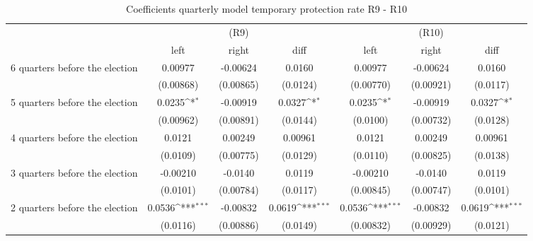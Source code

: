 \begin{table}[!ht]\centering \footnotesize
\def\sym#1{\ifmmode^{#1}\else\(^{#1}\)\fi}
\caption{Coefficients quarterly model temporary protection rate R9 - R10}
\begin{tabular}{l*{6}{c}}
\hline\hline
                    &\multicolumn{3}{c}{(R9)}&\multicolumn{3}{c}{(R10)}\\
&\multicolumn{1}{c}{left}&\multicolumn{1}{c}{right}&\multicolumn{1}{c}{diff}&\multicolumn{1}{c}{left}&\multicolumn{1}{c}{right}&\multicolumn{1}{c}{diff}\\
\hline
 6 quarters before the election&     0.00977         &    -0.00624         &      0.0160         &     0.00977         &    -0.00624         &      0.0160         \\
                    &   (0.00868)         &   (0.00865)         &    (0.0124)         &   (0.00770)         &   (0.00921)         &    (0.0117)         \\
[0,5em]
 5 quarters before the election&      0.0235\sym{*}  &    -0.00919         &      0.0327\sym{*}  &      0.0235\sym{*}  &    -0.00919         &      0.0327\sym{*}  \\
                    &   (0.00962)         &   (0.00891)         &    (0.0144)         &    (0.0100)         &   (0.00732)         &    (0.0128)         \\
[0,5em]
 4 quarters before the election&      0.0121         &     0.00249         &     0.00961         &      0.0121         &     0.00249         &     0.00961         \\
                    &    (0.0109)         &   (0.00775)         &    (0.0129)         &    (0.0110)         &   (0.00825)         &    (0.0138)         \\
[0,5em]
 3 quarters before the election&    -0.00210         &     -0.0140         &      0.0119         &    -0.00210         &     -0.0140         &      0.0119         \\
                    &    (0.0101)         &   (0.00784)         &    (0.0117)         &   (0.00845)         &   (0.00747)         &    (0.0101)         \\
[0,5em]
 2 quarters before the election&      0.0536\sym{***}&    -0.00832         &      0.0619\sym{***}&      0.0536\sym{***}&    -0.00832         &      0.0619\sym{***}\\
                    &    (0.0116)         &   (0.00886)         &    (0.0149)         &   (0.00832)         &   (0.00929)         &    (0.0121)         \\

\end{tabular}
\end{table}
